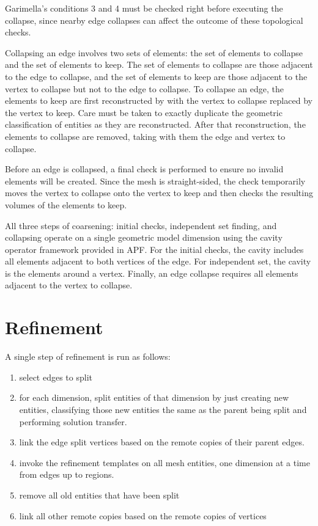 \documentclass{article}
\begin{document}
Garimella's conditions 3 and 4 must be checked right before executing the collapse,
since nearby edge collapses can affect the outcome of these topological checks.

Collapsing an edge involves two sets of elements: the set of elements to collapse
and the set of elements to keep.
The set of elements to collapse are those adjacent to the edge to collapse,
and the set of elements to keep are those adjacent to the vertex to collapse
but not to the edge to collapse.
To collapse an edge, the elements to keep are first reconstructed by with
the vertex to collapse replaced by the vertex to keep.
Care must be taken to exactly duplicate the geometric classification of
entities as they are reconstructed.
After that reconstruction, the elements to collapse are removed, taking
with them the edge and vertex to collapse.

Before an edge is collapsed, a final check is performed to ensure no invalid
elements will be created.
Since the mesh is straight-sided, the check temporarily moves the vertex to
collapse onto the vertex to keep and then checks the resulting volumes of the elements to keep.

All three steps of coarsening: initial checks, independent set finding, and collapsing
operate on a single geometric model dimension using the cavity operator
framework provided in APF.
For the initial checks, the cavity includes all elements adjacent to both
vertices of the edge.
For independent set, the cavity is the elements around a vertex.
Finally, an edge collapse requires all elements adjacent to the vertex to collapse.

\section{Refinement}

A single step of refinement is run as follows:
\begin{enumerate}
\item select edges to split
\item for each dimension, split entities of that dimension
by just creating new entities,
classifying those new entities the same as the parent being split
and performing solution transfer.
\item link the edge split vertices based on the remote
copies of their parent edges.
\item invoke the refinement templates on all mesh entities,
one dimension at a time from edges up to regions.
\item remove all old entities that have been split
\item link all other remote copies based on the remote copies
of vertices
\end{enumerate}
\end{document}
